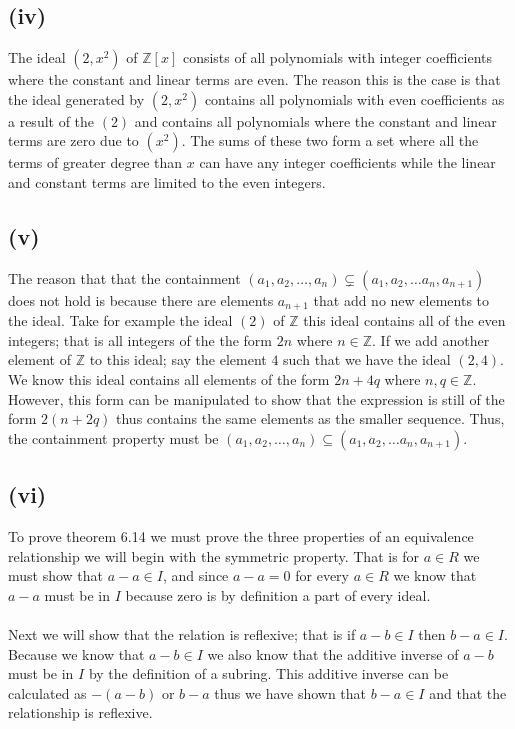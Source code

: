 \documentclass{article}
\begin{document}
    \subsection*{(iv)}
      The ideal $(2, x^2)$ of $\mathbb{Z}[x]$ consists of all polynomials with integer coefficients where the constant and linear terms are even. The reason this is the case is that the ideal generated by $(2, x^2)$ contains all polynomials with even coefficients as a result of the $(2)$ and contains all polynomials where the constant and linear terms are zero due to $(x^2)$. The sums of these two form a set where all the terms of greater degree than $x$ can have any integer coefficients while the linear and constant terms are limited to the even integers.

    \subsection*{(v)}
      The reason that that the containment $(a_1, a_2, \dots, a_n) \subsetneq (a_1, a_2, \dots a_n, a_{n+1})$ does not hold is because there are elements $a_{n+1}$ that add no new elements to the ideal. Take for example the ideal $(2)$ of $\mathbb{Z}$ this ideal contains all of the even integers; that is all integers of the the form $2n$ where $n \in \mathbb{Z}$. If we add another element of $\mathbb{Z}$ to this ideal; say the element $4$ such that we have the ideal $(2,4)$. We know this ideal contains all elements of the form $2n + 4q$ where $n,q \in \mathbb{Z}$. However, this form can be manipulated to show that the expression is still of the form $2(n+2q)$ thus contains the same elements as the smaller sequence. Thus, the containment property must be $(a_1, a_2, \dots, a_n) \subseteq (a_1, a_2, \dots a_n, a_{n+1})$.
      
    \subsection*{(vi)}
      To prove theorem 6.14 we must prove the three properties of an equivalence relationship we will begin with the symmetric property. That is for $a \in R$ we must show that $a - a \in I$, and since $a-a = 0$ for every $a \in R$ we know that $a-a$ must be in $I$ because zero is by definition a part of every ideal.

      \paragraph{} Next we will show that the relation is reflexive; that is if $a-b \in I$ then $b-a \in I$. Because we know that $a-b \in I$ we also know that the additive inverse of $a-b$ must be in $I$ by the definition of a subring. This additive inverse can be calculated as $- (a-b)$ or $b-a$ thus we have shown that $b-a \in I$ and that the relationship is reflexive.
\end{document}

